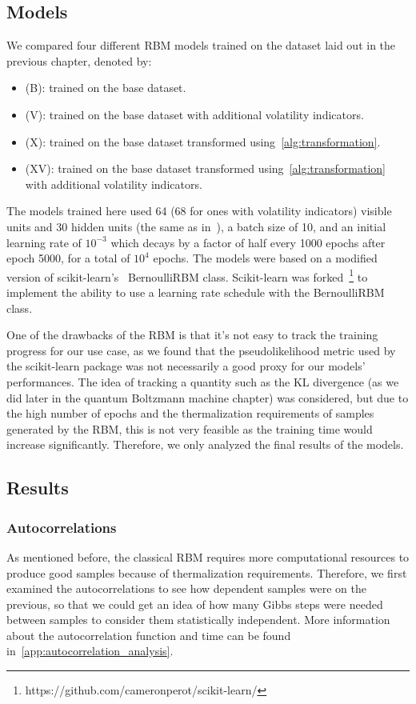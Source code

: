 \subsection{Models}
We compared four different RBM models trained on the dataset laid out in the previous chapter, denoted by:
\begin{itemize}
    \item (B): trained on the base dataset.
    \item (V): trained on the base dataset with additional volatility indicators.
    \item (X): trained on the base dataset transformed using~\cref{alg:transformation}.
    \item (XV): trained on the base dataset transformed using~\cref{alg:transformation} with additional volatility indicators.
\end{itemize}
The models trained here used 64 (68 for ones with volatility indicators) visible units and 30 hidden units (the same as in~\cite{kondratyev_2019}), a batch size of 10, and an initial learning rate of \( 10^{-3} \) which decays by a factor of half every 1000 epochs after epoch 5000, for a total of \( 10^4 \) epochs.
The models were based on a modified version of scikit-learn's~\cite{python_sklearn} BernoulliRBM class.
Scikit-learn was forked~\footnote{https://github.com/cameronperot/scikit-learn/} to implement the ability to use a learning rate schedule with the BernoulliRBM class.

One of the drawbacks of the RBM is that it's not easy to track the training progress for our use case, as we found that the pseudolikelihood metric used by the scikit-learn package was not necessarily a good proxy for our models' performances.
The idea of tracking a quantity such as the KL divergence (as we did later in the quantum Boltzmann machine chapter) was considered, but due to the high number of epochs and the thermalization requirements of samples generated by the RBM, this is not very feasible as the training time would increase significantly.
Therefore, we only analyzed the final results of the models.

\subsection{Results}
\subsubsection{Autocorrelations}
As mentioned before, the classical RBM requires more computational resources to produce good samples because of thermalization requirements.
Therefore, we first examined the autocorrelations to see how dependent samples were on the previous, so that we could get an idea of how many Gibbs steps were needed between samples to consider them statistically independent.
More information about the autocorrelation function and time can be found in~\cref{app:autocorrelation_analysis}.

